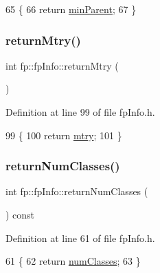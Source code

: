 \begin{DoxyCode}
65                                               \{
66                 \textcolor{keywordflow}{return} \hyperlink{classfp_1_1fpInfo_a128fab7ba6da0fc76da00b48bb1bd7d5}{minParent};
67             \}
\end{DoxyCode}
\mbox{\label{classfp_1_1fpInfo_a058477c4f05818c220efa469b7b630bb}} 
\subsubsection{\texorpdfstring{return\+Mtry()}{returnMtry()}}
{\footnotesize\ttfamily int fp\+::fp\+Info\+::return\+Mtry (\begin{DoxyParamCaption}{ }\end{DoxyParamCaption})\hspace{0.3cm}{\ttfamily [inline]}}



Definition at line 99 of file fp\+Info.\+h.


\begin{DoxyCode}
99                                    \{
100                 \textcolor{keywordflow}{return} \hyperlink{classfp_1_1fpInfo_a62cccc1eb5641ebec2a6cc86cf03eedf}{mtry};
101             \}
\end{DoxyCode}
\mbox{\label{classfp_1_1fpInfo_ae93937d429b68d88f40fd4f40b3339da}} 
\subsubsection{\texorpdfstring{return\+Num\+Classes()}{returnNumClasses()}}
{\footnotesize\ttfamily int fp\+::fp\+Info\+::return\+Num\+Classes (\begin{DoxyParamCaption}{ }\end{DoxyParamCaption}) const\hspace{0.3cm}{\ttfamily [inline]}}



Definition at line 61 of file fp\+Info.\+h.


\begin{DoxyCode}
61                                                \{
62                 \textcolor{keywordflow}{return} \hyperlink{classfp_1_1fpInfo_a1c98a9ced12230f21003f78d742625a3}{numClasses};
63             \}
\end{DoxyCode}
\mbox{\label{classfp_1_1fpInfo_a30ec8a4f116421a193d33fe2052aaa9a}} 

